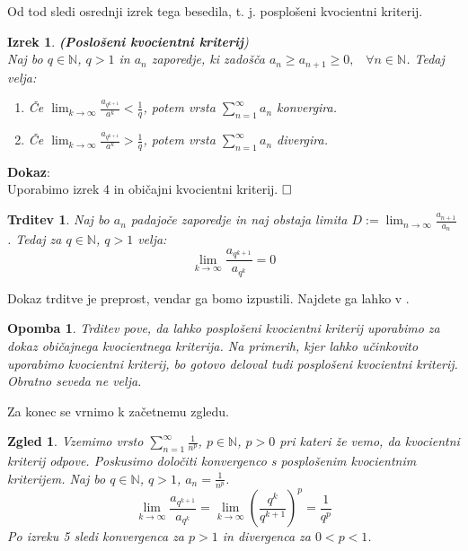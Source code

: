 \documentclass[a4paper,12pt]{article}
\def\N{\mathbb{N}} %
\def\qed{$\hfill\Box$}   %
\newtheorem{izrek}{Izrek}
\newtheorem{trditev}{Trditev}
\newtheorem{opomba}{Opomba}
\newtheorem{zgled}{Zgled}
\begin{document}
Od tod sledi osrednji izrek tega besedila, t. j. posplošeni kvocientni kriterij.

\begin{izrek}\textbf{(Poslošeni kvocientni kriterij})\\
Naj bo $q \in \N$, $q > 1$ in ${a_n}$ zaporedje,
ki zadošča $a_{n} \geq a_{n+1} \geq 0 \text{,} \quad \forall n \in \N$.
Tedaj velja:

\begin{enumerate}
    \item Če $\lim_{k \to \infty}{\frac{a_{q^{k + 1}}}{a^k}} < \frac{1}{q}$,
    potem vrsta $\sum_{n = 1}^{\infty}{a_n}$ konvergira.
    \item Če $\lim_{k \to \infty}{\frac{a_{q^{k + 1}}}{a^k}} > \frac{1}{q}$,
    potem vrsta $\sum_{n = 1}^{\infty}{a_n}$ divergira.
\end{enumerate}
\end{izrek}

\noindent
\textbf{Dokaz}:\\
Uporabimo izrek 4 in običajni kvocientni kriterij.
\qed

\begin{trditev}
    Naj bo $a_{n}$ padajoče zaporedje in naj obstaja limita
    $D := \lim_{n \to \infty}{\frac{a_{n + 1}}{a_n}}$. Tedaj za $q \in {\mathbb{N}}$, $q > 1$ velja:
    \[
        \lim_{k \to \infty}{\frac{a_{q^{k + 1}}}{a_{q^k}}} = 0
    \]
\end{trditev}

Dokaz trditve je preprost, vendar ga bomo izpustili. Najdete ga lahko v \cite{convergence}.

\begin{opomba}
    Trditev pove, da lahko posplošeni kvocientni kriterij uporabimo za dokaz običajnega
    kvocientnega kriterija. Na primerih, kjer lahko učinkovito uporabimo kvocientni kriterij,
    bo gotovo deloval tudi posplošeni kvocientni kriterij. Obratno seveda ne velja.
\end{opomba}

\noindent
Za konec se vrnimo k začetnemu zgledu.
\begin{zgled}
    Vzemimo vrsto $\sum_{n = 1}^{\infty}{\frac{1}{n^p}}$, $p \in \N$, $p > 0$ pri kateri
    že vemo, da kvocientni kriterij odpove. Poskusimo določiti konvergenco s posplošenim kvocientnim kriterijem.
    Naj bo $q \in \N$, $q > 1$, $a_n = \frac{1}{n^p}$.
    \[
            \lim_{k \to \infty}{\frac{a_{q^{k + 1}}}{a_{q^k}}} =
            \lim_{k \to \infty}{(\frac{q^k}{q^{k+1}})^p} = \frac{1}{q^p}
    \]
    Po izreku 5 sledi konvergenca za $p>1$ in divergenca za $ 0< p<1$.
\end{zgled}
\end{document}
